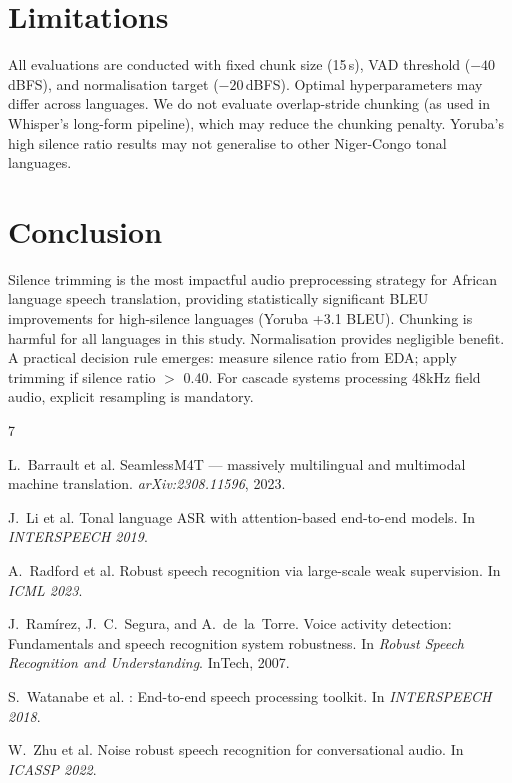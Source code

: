 \documentclass[a4paper]{article}
\begin{document}
\section{Limitations}
\label{sec:limitations}

All evaluations are conducted with fixed chunk size (15\,s), VAD threshold ($-40$\,dBFS), and normalisation target ($-20$\,dBFS). Optimal hyperparameters may differ across languages. We do not evaluate overlap-stride chunking (as used in Whisper's long-form pipeline), which may reduce the chunking penalty. Yoruba's high silence ratio results may not generalise to other Niger-Congo tonal languages.

\section{Conclusion}
\label{sec:conclusion}

Silence trimming is the most impactful audio preprocessing strategy for African language speech translation, providing statistically significant BLEU improvements for high-silence languages (Yoruba +3.1 BLEU). Chunking is harmful for all languages in this study. Normalisation provides negligible benefit. A practical decision rule emerges: measure silence ratio from EDA; apply trimming if silence ratio $>$ 0.40. For cascade systems processing 48kHz field audio, explicit resampling is mandatory.




\begin{thebibliography}{7}

L.~Barrault et al.
\newblock SeamlessM4T — massively multilingual and multimodal machine translation.
\newblock \emph{arXiv:2308.11596}, 2023.

J.~Li et al.
\newblock Tonal language ASR with attention-based end-to-end models.
\newblock In \emph{INTERSPEECH 2019}.

A.~Radford et al.
\newblock Robust speech recognition via large-scale weak supervision.
\newblock In \emph{ICML 2023}.

J.~Ram{\'i}rez, J.~C.~Segura, and A.~de~la~Torre.
\newblock Voice activity detection: Fundamentals and speech recognition system robustness.
\newblock In \emph{Robust Speech Recognition and Understanding}. InTech, 2007.

S.~Watanabe et al.
: End-to-end speech processing toolkit.
\newblock In \emph{INTERSPEECH 2018}.

W.~Zhu et al.
\newblock Noise robust speech recognition for conversational audio.
\newblock In \emph{ICASSP 2022}.

\end{thebibliography}
\end{document}
